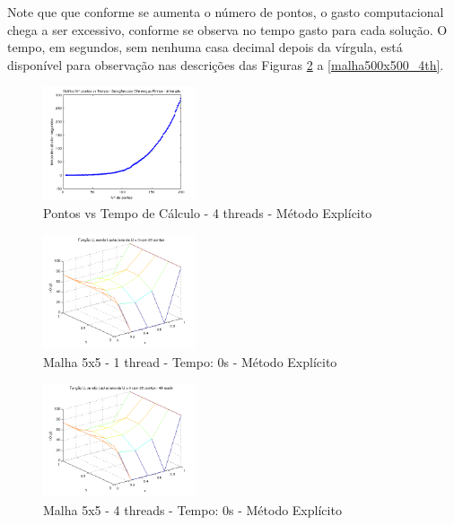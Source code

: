 \documentclass[journal]{IEEEtran}
\begin{document}
Note que que conforme se aumenta o número de pontos, o gasto computacional chega a ser excessivo, conforme se observa no tempo gasto para cada solução. O tempo, em segundos, sem nenhuma casa decimal depois da vírgula, está disponível para observação nas descrições das Figuras \ref{malha5x5_1th} a \ref{malha500x500_4th}.

\begin{figure}[ht!]
\centering
\includegraphics[width = 0.4\textwidth]{figures/problema01_m1/08.png}
\caption{Pontos vs Tempo de Cálculo - 4 threads - Método Explícito\label{pontos_vs_tempo_4th}}
\end{figure}

\begin{figure}[ht!]
\centering
\includegraphics[width = 0.4\textwidth]{figures/problema01_m1/01.png}
\caption{Malha 5x5 - 1 thread - Tempo: 0s - Método Explícito\label{malha5x5_1th}}
\end{figure}

\begin{figure}[ht!]
\centering
\includegraphics[width = 0.4\textwidth]{figures/problema01_m1/09.png}
\caption{Malha 5x5 - 4 threads - Tempo: 0s - Método Explícito\label{malha5x5_4th}}
\end{figure}
\end{document}
